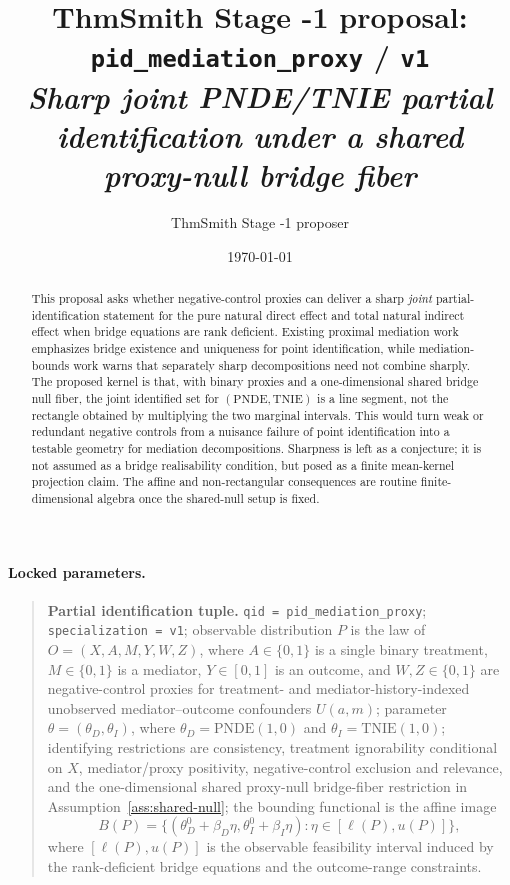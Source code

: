 \documentclass[11pt]{article}
\title{ThmSmith Stage -1 proposal: \texttt{pid\_mediation\_proxy} / \texttt{v1}%
  \\ \large\textit{Sharp joint PNDE/TNIE partial identification under a shared proxy-null bridge fiber}}
\author{ThmSmith Stage -1 proposer}
\date{\today}
\theoremstyle{definition}
\theoremstyle{plain}
\theoremstyle{remark}
\begin{document}
\maketitle


\paragraph{Locked parameters.}
\begin{quote}
\textbf{Partial identification tuple.}
\texttt{qid = pid\_mediation\_proxy};
\texttt{specialization = v1};
observable distribution \(P\) is the law of \(O=(X,A,M,Y,W,Z)\), where
\(A\in\{0,1\}\) is a single binary treatment, \(M\in\{0,1\}\) is a mediator,
\(Y\in[0,1]\) is an outcome, and \(W,Z\in\{0,1\}\) are negative-control
proxies for treatment- and mediator-history-indexed unobserved
mediator--outcome confounders \(U(a,m)\);
parameter \(\theta=(\theta_D,\theta_I)\), where
\(\theta_D=\mathrm{PNDE}(1,0)\) and \(\theta_I=\mathrm{TNIE}(1,0)\);
identifying restrictions are consistency, treatment ignorability conditional
on \(X\), mediator/proxy positivity, negative-control exclusion and relevance,
and the one-dimensional shared proxy-null bridge-fiber restriction in
Assumption~\ref{ass:shared-null};
the bounding functional is the affine image
\[
  B(P)=\{(\theta_D^0+\beta_D\eta,\theta_I^0+\beta_I\eta):
       \eta\in[\ell(P),u(P)]\},
\]
where \([\ell(P),u(P)]\) is the observable feasibility interval induced by
the rank-deficient bridge equations and the outcome-range constraints.
\end{quote}

\begin{abstract}
This proposal asks whether negative-control proxies can deliver a sharp
\emph{joint} partial-identification statement for the pure natural direct
effect and total natural indirect effect when bridge equations are rank
deficient.  Existing proximal mediation work emphasizes bridge existence and
uniqueness for point identification, while mediation-bounds work warns that
separately sharp decompositions need not combine sharply.  The proposed kernel
is that, with binary proxies and a one-dimensional shared bridge null fiber,
the joint identified set for \((\mathrm{PNDE},\mathrm{TNIE})\) is a line
segment, not the rectangle obtained by multiplying the two marginal intervals.
This would turn weak or redundant negative controls from a nuisance failure of
point identification into a testable geometry for mediation decompositions.
Sharpness is left as a conjecture; it is not assumed as a bridge
realisability condition, but posed as a finite mean-kernel projection claim.
The affine and non-rectangular consequences are routine finite-dimensional
algebra once the shared-null setup is fixed.
\end{abstract}
\end{document}
